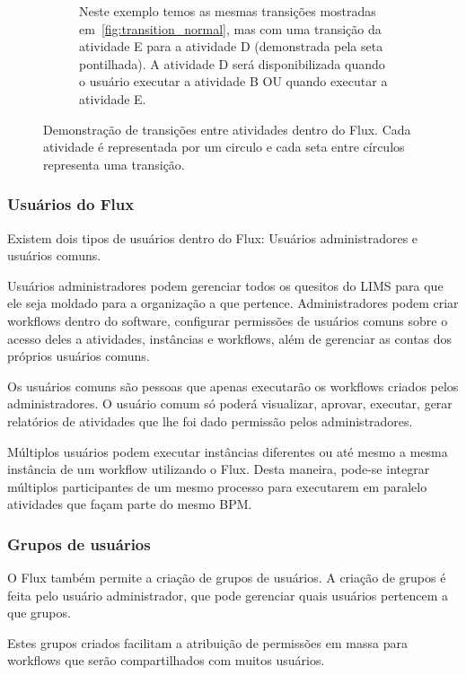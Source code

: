\begin{figure}
\begin{subfigure}[b]{0.45\textwidth}
        \caption{Neste exemplo temos as mesmas transições mostradas em~\ref{fig:transition_normal}, mas com uma transição da atividade E para a atividade D (demonstrada pela seta pontilhada). A atividade D será disponibilizada quando o usuário executar a atividade B OU quando executar a atividade E.}
        \label{fig:transition_ref}
    \end{subfigure}
    \caption{Demonstração de transições entre atividades dentro do Flux. Cada atividade é representada por um circulo e cada seta entre círculos representa uma transição.}
    \label{fig:transitions}
\end{figure}

\subsubsection{Usuários do Flux}

Existem dois tipos de usuários dentro do Flux: Usuários administradores e usuários comuns.

Usuários administradores podem gerenciar todos os quesitos do LIMS para que ele seja moldado para a organização a que pertence. Administradores podem criar workflows dentro do software, configurar permissões de usuários comuns sobre o acesso deles a atividades, instâncias e workflows, além de gerenciar as contas dos próprios usuários comuns.

Os usuários comuns são pessoas que apenas executarão os workflows criados pelos administradores. O usuário comum só poderá visualizar, aprovar, executar, gerar relatórios de atividades que lhe foi dado permissão pelos administradores.

Múltiplos usuários podem executar instâncias diferentes ou até mesmo a mesma instância de um workflow utilizando o Flux. Desta maneira, pode-se integrar múltiplos participantes de um mesmo processo para executarem em paralelo atividades que façam parte do mesmo BPM.

\subsubsection{Grupos de usuários}

O Flux também permite a criação de grupos de usuários. A criação de grupos é feita pelo usuário administrador, que pode gerenciar quais usuários pertencem a que grupos.

Estes grupos criados facilitam a atribuição de permissões em massa para workflows que serão compartilhados com muitos usuários.

